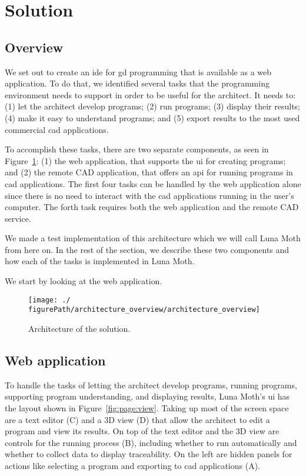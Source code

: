
\section{Solution}
\label{sec:solution}


\subsection{Overview}
We set out to create an \gls{ide} for \gls{gd} programming that is available as a web application.
To do that, we identified several tasks that the programming environment needs to support in order to be useful for the architect.
It needs to:
(1) let the architect develop programs;
(2) run programs;
(3) display their results;
(4) make it easy to understand programs;
and (5) export results to the most used commercial \gls{cad} applications.

To accomplish these tasks, there are two separate components, as seen in Figure~\ref{fig:archi:sol}: (1) the web application, that supports the \gls{ui} for creating programs;  and (2) the remote CAD application, that offers an \gls{api} for running programs in \gls{cad} applications.
The first four tasks can be handled by the web application alone since there is no need to interact with the \gls{cad} applications running in the user's computer.
The forth task requires both the web application and the remote CAD service.

We made a test implementation of this architecture which we will call Luna Moth from here on.
In the rest of the section, we describe these two components and how each of the tasks is implemented in Luna Moth.

We start by looking at the web application.

\begin{figure}
  \centering
  \texttt{[image: ./\\figurePath/architecture\_overview/architecture\_overview]}
  \caption{Architecture of the solution.}
  \label{fig:archi:sol}
\end{figure}


\subsection{Web application}
To handle the tasks of letting the architect develop programs, running programs, supporting program understanding, and displaying results, Luna Moth's \gls{ui} has the layout shown in Figure~\ref{fig:page:view}.
Taking up most of the screen space are a text editor (C) and a 3D view (D) that allow the architect to edit a program and view its results.
On top of the text editor and the 3D view are controls for the running process (B), including whether to run automatically and whether to collect data to display traceability.
On the left are hidden panels for actions like selecting a program and exporting to \gls{cad} applications (A).

